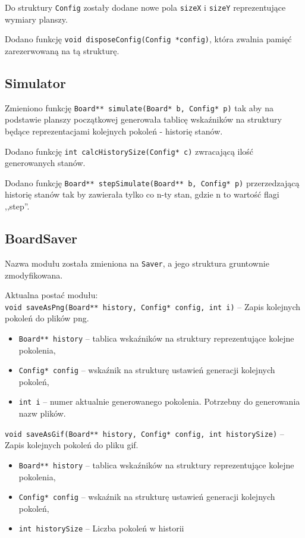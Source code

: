 \documentclass{mwart}
\begin{document}
Do struktury \texttt{Config} zostały dodane nowe pola \texttt{sizeX} i \texttt{sizeY} reprezentujące wymiary planszy. 

Dodano funkcję \texttt{void disposeConfig(Config *config)}, która zwalnia pamięć zarezerwowaną na tą strukturę.

\subsection{Simulator}
Zmieniono funkcję \texttt{Board** simulate(Board* b, Config* p)} tak aby na podstawie planszy początkowej generowała tablicę wskaźników na struktury będące reprezentacjami kolejnych pokoleń - historię stanów.

Dodano funkcję \texttt{int calcHistorySize(Config* c)} zwracającą ilość generowanych stanów.

Dodano funkcję \texttt{Board** stepSimulate(Board** b, Config* p)} przerzedzającą historię stanów tak by zawierała tylko co n-ty stan, gdzie n to wartość flagi ,,step''.





\subsection{BoardSaver}
Nazwa modułu została zmieniona na \texttt{Saver}, a jego struktura gruntownie zmodyfikowana.

Aktualna postać modułu:\\
\texttt{void saveAsPng(Board** history, Config* config, int i)} -- Zapis kolejnych pokoleń do plików png.
\begin{itemize}[label={}]
	\item\texttt{Board** history} -- tablica wskaźników na struktury reprezentujące kolejne pokolenia,
	\item\texttt{Config* config} -- wskaźnik na strukturę ustawień generacji kolejnych pokoleń,
	\item \texttt{int i} -- numer aktualnie generowanego pokolenia. Potrzebny do generowania nazw plików.
\end{itemize}

\noindent{}\texttt{void saveAsGif(Board** history, Config* config, int historySize)} -- Zapis kolejnych pokoleń do pliku gif.
\begin{itemize}[label={}]
	\item\texttt{Board** history} -- tablica wskaźników na struktury reprezentujące kolejne pokolenia,
	\item\texttt{Config* config} -- wskaźnik na strukturę ustawień generacji kolejnych pokoleń,
	\item \texttt{int historySize} -- Liczba pokoleń w historii
\end{itemize}
\end{document}
